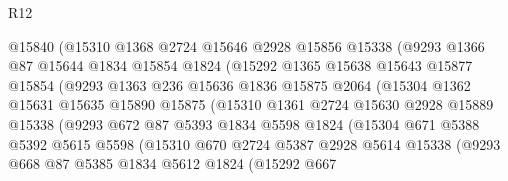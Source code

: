 \begin{lexlean}{R12}
\begin{coremodule}
                    @15840
                    (@15310
                      @1368
                      @2724
                      @15646
                      @2928
                      @15856
                      @15338
                      (@9293
                        @1366
                        @87
                        @15644
                        @1834
                        @15854
                        @1824
                        (@15292
                          @1365
                          @15638
                          @15643
                          @15877
                          @15854
                          (@9293
                            @1363
                            @236
                            @15636
                            @1836
                            @15875
                            @2064
                            (@15304
                              @1362
                              @15631
                              @15635
                              @15890
                              @15875
                              (@15310
                                @1361
                                @2724
                                @15630
                                @2928
                                @15889
                                @15338
                                (@9293
                                  @672
                                  @87
                                  @5393
                                  @1834
                                  @5598
                                  @1824
                                  (@15304
                                    @671
                                    @5388
                                    @5392
                                    @5615
                                    @5598
                                    (@15310
                                      @670
                                      @2724
                                      @5387
                                      @2928
                                      @5614
                                      @15338
                                      (@9293
                                        @668
                                        @87
                                        @5385
                                        @1834
                                        @5612
                                        @1824
                                        (@15292
                                          @667

\end{coremodule}
\end{lexlean}
